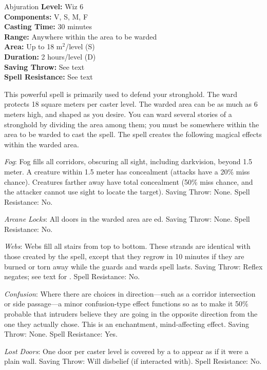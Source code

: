 {Abjuration}
{
	\textbf{Level:}
	Wiz 6\\
	\textbf{Components:}
	V, S, M, F\\
	\textbf{Casting Time:}
	30 minutes\\
	\textbf{Range:}
	Anywhere within the area to be warded\\
	\textbf{Area:}
	Up to 18 m$^2$/level (S)\\
	\textbf{Duration:}
	2 hours/level (D)\\
	\textbf{Saving Throw:}
	See text\\
	\textbf{Spell Resistance:}
	See text\\
}
{
	This powerful spell is primarily used to defend your stronghold. The ward protects 18 square meters per caster level. The warded area can be as much as 6 meters high, and shaped as you desire. You can ward several stories of a stronghold by dividing the area among them; you must be somewhere within the area to be warded to cast the spell. The spell creates the following magical effects within the warded area.

	\textit{Fog}:
	Fog fills all corridors, obscuring all sight, including darkvision, beyond 1.5 meter. A creature within 1.5 meter has concealment (attacks have a 20\% miss chance). Creatures farther away have total concealment (50\% miss chance, and the attacker cannot use sight to locate the target). Saving Throw: None. Spell Resistance: No.

	\textit{Arcane Locks}:
	All doors in the warded area are ed. Saving Throw: None. Spell Resistance: No.

	\textit{Webs}:
	Webs fill all stairs from top to bottom. These strands are identical with those created by the  spell, except that they regrow in 10 minutes if they are burned or torn away while the guards and wards spell lasts. Saving Throw: Reflex negates; see text for . Spell Resistance: No.

	\textit{Confusion}:
	Where there are choices in direction---such as a corridor intersection or side passage---a minor confusion-type effect functions so as to make it 50\% probable that intruders believe they are going in the opposite direction from the one they actually chose. This is an enchantment, mind-affecting effect. Saving Throw: None. Spell Resistance: Yes.

	\textit{Lost Doors}:
	One door per caster level is covered by a  to appear as if it were a plain wall. Saving Throw: Will disbelief (if interacted with). Spell Resistance: No.

}
